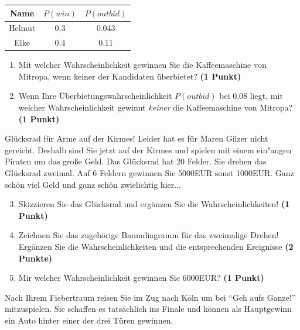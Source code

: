 \documentclass[a4paper, 10pt]{scrartcl}\usepackage[]{graphicx}\usepackage[]{xcolor}
\begin{document}
\begin{center}
\begin{tabular}{ccc}
  \toprule
  Name & $P(win)$ & $P(outbid)$\\
  \midrule
  Helmut & 0.3 & 0.043\\
  Elke & 0.4 & 0.11 \\
  \bottomrule
\end{tabular}
\end{center}

\begin{enumerate}
\item Mit welcher Wahrscheinlichkeit gewinnen Sie die Kaffeemaschine von
  Mitropa, wenn keiner der Kandidaten {\"u}berbietet? \textbf{(1 Punkt)}
\item Wenn Ihre {\"U}berbietungswahrscheinlichkeit $P(outbid)$ bei
  0.08 liegt, mit welcher Wahrscheinlichkeit gewinnt
  \textit{keiner} die Kaffeemaschine von Mitropa? \textbf{(1 Punkt)}
\end{enumerate}

Gl{\"u}cksrad f{\"u}r Arme auf der Kirmes! Leider hat es f{\"u}r Maren Gilzer nicht
gereicht. Deshalb sind Sie jetzt auf der Kirmes und spielen mit
einem ein{"a}ugen Piraten um das gro{\ss}e Geld. Das Gl{\"u}cksrad hat 20
Felder. Sie drehen das Gl{\"u}cksrad zweimal. Auf 6 Feldern
gewinnen Sie 5000EUR sonst 1000EUR. Ganz sch{\"o}n viel Geld
und ganz sch{\"o}n zwielichtig hier...

\begin{enumerate}
  \setcounter{enumi}{2}  
\item Skizzieren Sie das Gl{\"u}cksrad und erg{\"a}nzen Sie die
  Wahrscheinlichkeiten! \textbf{(1 Punkt)}
\item Zeichnen Sie das zugeh{\"o}rige Baumdiagramm f{\"u}r das zweimalige Drehen!
  Erg{\"a}nzen Sie die Wahrscheinlichkeiten und die entsprechenden Ereignisse
  \textbf{(2 Punkte)}
\item Mir welcher Wahrscheinlichkeit gewinnen Sie 6000EUR? \textbf{(1
    Punkt)}
\end{enumerate}

Nach Ihrem Fiebertraum reisen Sie im Zug nach K{\"o}ln um bei "`Geh aufs
Ganze!"' mitzuspielen. Sie schaffen es tats{\"a}chlich ins Finale und k{\"o}nnen
als Hauptgewinn ein Auto hinter einer der drei T{\"u}ren gewinnen. 
\end{document}
